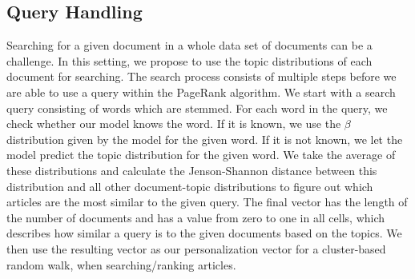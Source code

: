 \subsection{Query Handling}
Searching for a given document in a whole data set of documents can be a challenge. 
In this setting, we propose to use the topic distributions of each document for searching.
The search process consists of multiple steps before we are able to use a query within the PageRank algorithm. 
We start with a search query consisting of words which are stemmed.
For each word in the query, we check whether our model knows the word.
If it is known, we use the $\beta$ distribution given by the model for the given word. 
If it is not known, we let the model predict the topic distribution for the given word.
We take the average of these distributions and calculate the Jenson-Shannon distance between this distribution and all other document-topic distributions to figure out which articles are the most similar to the given query.
The final vector has the length of the number of documents and has a value from zero to one in all cells, which describes how similar a query is to the given documents based on the topics.
We then use the resulting vector as our personalization vector for a cluster-based random walk, when searching/ranking articles.
 
